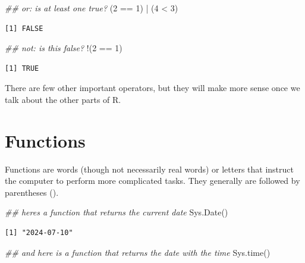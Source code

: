 \documentclass[
  letterpaper,
  DIV=11,
  numbers=noendperiod]{scrreprt}
\newenvironment{Shaded}{\begin{snugshade}}{\end{snugshade}}
\newcommand{\DecValTok}[1]{\textcolor[rgb]{0.68,0.00,0.00}{#1}}
\newcommand{\DocumentationTok}[1]{\textcolor[rgb]{0.37,0.37,0.37}{\textit{#1}}}
\newcommand{\FunctionTok}[1]{\textcolor[rgb]{0.28,0.35,0.67}{#1}}
\newcommand{\NormalTok}[1]{\textcolor[rgb]{0.00,0.23,0.31}{#1}}
\newcommand{\SpecialCharTok}[1]{\textcolor[rgb]{0.37,0.37,0.37}{#1}}
\begin{document}
\begin{Shaded}
\begin{Highlighting}[]
\DocumentationTok{\#\# or: is at least one true?}
\NormalTok{(}\DecValTok{2} \SpecialCharTok{==} \DecValTok{1}\NormalTok{) }\SpecialCharTok{|}\NormalTok{ (}\DecValTok{4} \SpecialCharTok{\textless{}} \DecValTok{3}\NormalTok{)}
\end{Highlighting}
\end{Shaded}

\begin{verbatim}
[1] FALSE
\end{verbatim}

\begin{Shaded}
\begin{Highlighting}[]
\DocumentationTok{\#\# not: is this false?}
\SpecialCharTok{!}\NormalTok{(}\DecValTok{2} \SpecialCharTok{==} \DecValTok{1}\NormalTok{)}
\end{Highlighting}
\end{Shaded}

\begin{verbatim}
[1] TRUE
\end{verbatim}

There are few other important operators, but they will make more sense
once we talk about the other parts of R.

\section{Functions}\label{functions}

Functions are words (though not necessarily real words) or letters that
instruct the computer to perform more complicated tasks. They generally
are followed by parentheses ().

\begin{Shaded}
\begin{Highlighting}[]
\DocumentationTok{\#\# here\textquotesingle{}s a function that returns the current date}
\FunctionTok{Sys.Date}\NormalTok{()}
\end{Highlighting}
\end{Shaded}

\begin{verbatim}
[1] "2024-07-10"
\end{verbatim}

\begin{Shaded}
\begin{Highlighting}[]
\DocumentationTok{\#\# and here is a function that returns the date with the time}
\FunctionTok{Sys.time}\NormalTok{()}
\end{Highlighting}
\end{Shaded}
\end{document}
